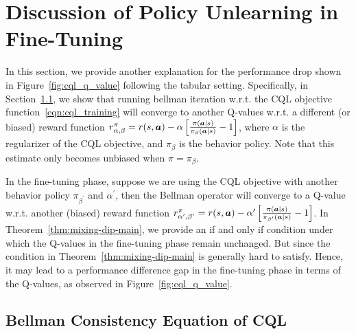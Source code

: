 \iffalse

\section{Discussion of Policy Unlearning in Fine-Tuning}

In this section, we provide another explanation for the performance drop shown in Figure~\ref{fig:cql_q_value} following the tabular setting. Specifically, in Section~\ref{subsec:reward-bias}, we show that running bellman iteration w.r.t. the CQL objective function~\eqref{eqn:cql_training} will converge to another Q-values w.r.t. a different (or biased) reward function $r^\pi_{\alpha,\beta}=r(s,\boldsymbol{a}) - \alpha\left[  \frac{\pi(\boldsymbol{a}|s)}{\pi_\beta(\boldsymbol{a}|s)} - 1  \right]$, where $\alpha$ is the regularizer of the CQL objective, and $\pi_\beta$ is the behavior policy. Note that this estimate only becomes unbiased when $\pi=\pi_\beta$.

In the fine-tuning phase, suppose we are using the CQL objective with another behavior policy $\pi_{\beta^\prime}$ and $\alpha^\prime$, then the Bellman operator will converge to a Q-value w.r.t. another (biased) reward function $r^\pi_{\alpha^\prime,\beta^\prime}=r(s,\boldsymbol{a}) - \alpha^\prime\left[  \frac{\pi(\boldsymbol{a}|s)}{\pi_{\beta^\prime}(\boldsymbol{a}|s)} - 1  \right]$. In Theorem~\ref{thm:mixing-dip-main}, we provide an if and only if condition under which the Q-values in the fine-tuning phase remain unchanged. But since the condition in Theorem~\ref{thm:mixing-dip-main} is generally hard to satisfy. Hence, it may lead to a performance difference gap in the fine-tuning phase in terms of the Q-values, as observed in Figure~\ref{fig:cql_q_value}.

\subsection{Bellman Consistency Equation of CQL}
 
\label{subsec:reward-bias}


